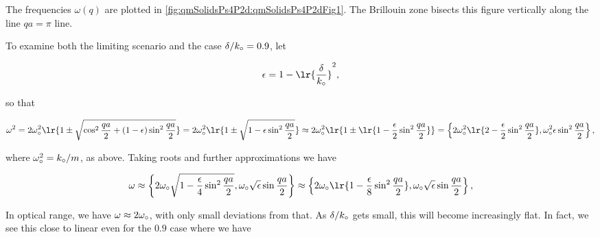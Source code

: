 {


The frequencies \(\omega(q)\) are plotted in \cref{fig:qmSolidsPs4P2d:qmSolidsPs4P2dFig1}.  The Brillouin zone bisects this figure vertically along the line \(q a = \pi\) line.



To examine both the limiting scenario and the case \(\delta/k_\circ = 0.9\), let

\begin{dmath}\label{eqn:condensedMatterProblemSet4Problem2:740}
\epsilon = 1 - \lr{\frac{\delta}{k_\nought}}^2,
\end{dmath}

so that

\begin{dmath}\label{eqn:condensedMatterProblemSet4Problem2:760}
\omega^2 
= 2 \omega_\nought^2 \lr{ 1 \pm \sqrt{ \cos^2\frac{qa}{2} + (1 - \epsilon) \sin^2 \frac{qa}{2}} }
= 2 \omega_\nought^2 \lr{ 1 \pm \sqrt{ 1 - \epsilon \sin^2 \frac{qa}{2}} }
\approx 2 \omega_\nought^2 \lr{ 1 \pm \lr{ 1 - \frac{\epsilon}{2} \sin^2 \frac{qa}{2}} }
=
\left\{2 \omega_\nought^2 \lr{ 2 - \frac{\epsilon}{2} \sin^2 \frac{qa}{2} },
\omega_\nought^2 \epsilon \sin^2 \frac{qa}{2}
\right\},
\end{dmath}

where \(\omega_\circ^2 = k_\circ/m\), as above.  Taking roots and further approximations we have

\begin{dmath}\label{eqn:condensedMatterProblemSet4Problem2:780}
\omega
\approx
\left\{2 \omega_\nought \sqrt{ 1 - \frac{\epsilon}{4} \sin^2 \frac{qa}{2} },
\omega_\nought \sqrt{\epsilon} \sin \frac{qa}{2} 
\right\}
\approx
\left\{
2 \omega_\nought \lr{ 1 - \frac{\epsilon}{8} \sin^2 \frac{qa}{2} },
\omega_\nought \sqrt{\epsilon} \sin \frac{qa}{2} 
\right\},
\end{dmath}

In optical  range, we have \(\omega \approx 2 \omega_\circ\), with only small deviations from that.  As \(\delta/k_\circ\) gets small, this will become increasingly flat.  In fact, we see this close to linear even for the \(0.9\) case where we have

}
